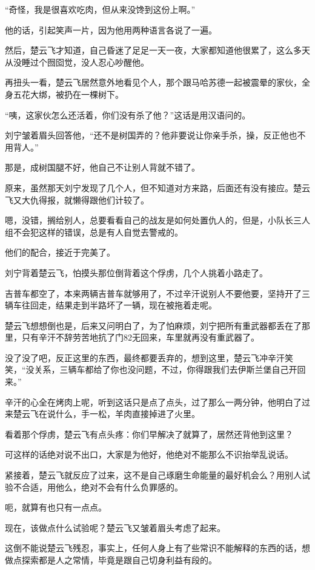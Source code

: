 “奇怪，我是很喜欢吃肉，但从来没馋到这份上啊。”

他的话，引起笑声一片，因为他用两种语言各说了一遍。

然后，楚云飞才知道，自己昏迷了足足一天一夜，大家都知道他很累了，这么多天从没睡过个囫囵觉，没人忍心吵醒他。

再扭头一看，楚云飞居然意外地看见个人，那个跟马哈苏德一起被震晕的家伙，全身五花大绑，被扔在一棵树下。

“咦，这家伙怎么还活着，你们没有杀了他？”这话是用汉语问的。

刘宁皱着眉头回答他，“还不是树国弄的？他非要说让你亲手杀，操，反正他也不用背人。”

那是，成树国腿不好，他自己不让别人背就不错了。

原来，虽然那天刘宁发现了几个人，但不知道对方来路，后面还有没有接应。楚云飞又大仇得报，就懒得跟他们计较了。

嗯，没错，搁给别人，总要看看自己的战友是如何处置仇人的，但是，小队长三人组不会犯这样的错误，总是有人自觉去警戒的。

他们的配合，接近于完美了。

刘宁背着楚云飞，怕摸头那位倒背着这个俘虏，几个人挑着小路走了。

吉普车都空了，本来两辆吉普车就够用了，不过辛汗说别人不要他要，坚持开了三辆车往回走，结果走到半路坏了一辆，现在被拖着走呢。

楚云飞想想倒也是，后来又问明白了，为了怕麻烦，刘宁把所有重武器都丢在了那里，只有辛汗不辞劳苦地抗了门82无回来，车里就再没有重武器了。

没了没了吧，反正这里的东西，最终都要丢弃的，想到这里，楚云飞冲辛汗笑笑，“没关系，三辆车都给了你也没问题，不过，你得跟我们去伊斯兰堡自己开回来。”

辛汗的心全在烤肉上呢，听到这话只是点了点头，过了那么一两分钟，他明白了过来楚云飞在说什么，手一松，羊肉直接掉进了火里。

看着那个俘虏，楚云飞有点头疼：你们早解决了就算了，居然还背他到这里？

可这样的话绝对说不出口，大家是为他好，他绝对不能那么不识抬举乱说话。

紧接着，楚云飞就反应了过来，这不是自己琢磨生命能量的最好机会么？用别人试验不合适，用他么，绝对不会有什么负罪感的。

呃，就算有也只有一点点。

现在，该做点什么试验呢？楚云飞又皱着眉头考虑了起来。

这倒不能说楚云飞残忍，事实上，任何人身上有了些常识不能解释的东西的话，想做点探索都是人之常情，毕竟是跟自己切身利益有段的。

